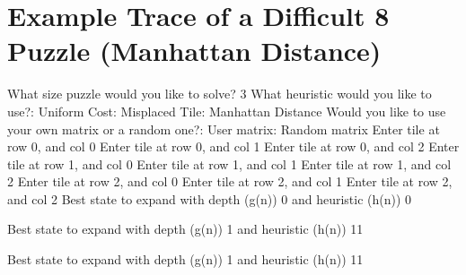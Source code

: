 \documentclass{article}
\begin{document}
\section{Example Trace of a Difficult 8 Puzzle (Manhattan Distance)}
{\noindent What size puzzle would you like to solve?\newline}
3
What heuristic would you like to use?:	Uniform Cost:	Misplaced Tile:	Manhattan Distance
Would you like to use your own matrix or a random one?:	User matrix:	Random matrix
Enter tile at row 0, and col 0
Enter tile at row 0, and col 1
Enter tile at row 0, and col 2
Enter tile at row 1, and col 0
Enter tile at row 1, and col 1
Enter tile at row 1, and col 2
Enter tile at row 2, and col 0
Enter tile at row 2, and col 1
Enter tile at row 2, and col 2
{\noindent Best state to expand with depth (g(n)) 0 and heuristic (h(n)) 0\newline}
{}\newline

{\noindent Best state to expand with depth (g(n)) 1 and heuristic (h(n)) 11\newline}
{}\newline

{\noindent Best state to expand with depth (g(n)) 1 and heuristic (h(n)) 11\newline}
{}\newline
\end{document}
